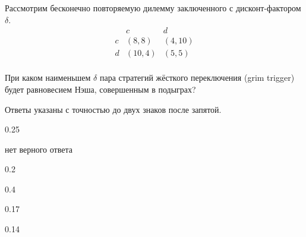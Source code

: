 
\begin{question}
Рассмотрим бесконечно повторяемую дилемму заключенного с
дисконт-фактором \(\delta\). \[
\begin{matrix}
   & c & d \\
c  & (8, 8) & (4, 10) \\
d  & (10, 4) & (5, 5) \\
\end{matrix}
\]

При каком наименьшем \(\delta\) пара стратегий жёсткого переключения
(grim trigger) будет равновесием Нэша, совершенным в подыграх?

Ответы указаны с точностью до двух знаков после запятой.
\begin{answerlist}
  \item 0.25
  \item нет верного ответа
  \item 0.2
  \item 0.4
  \item 0.17
  \item 0.14
\end{answerlist}
\end{question}


